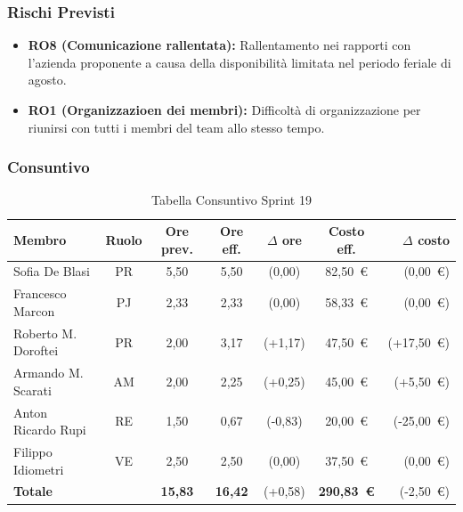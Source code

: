 \subsubsection{Rischi Previsti}
\begin{itemize}
    \item \textbf{RO8 (Comunicazione rallentata):} Rallentamento nei rapporti con l'azienda proponente a causa della disponibilità limitata nel periodo feriale di agosto.
    \item \textbf{RO1 (Organizzazioen dei membri):} Difficoltà di organizzazione per riunirsi con tutti i membri del team allo stesso tempo.
\end{itemize}

\subsubsection{Consuntivo}
\begin{table}[H]
    \centering
    \renewcommand{\arraystretch}{1.3}
    \begin{tabularx}{\textwidth}{|X|c|c|c|c|c|r|}
        \hline
        \textbf{Membro} & \textbf{Ruolo} & \textbf{Ore prev.} &
        \textbf{Ore eff.} & \textbf{$\Delta$ ore} &
        \textbf{Costo eff.} & \textbf{$\Delta$ costo} \\
        \hline
        Sofia De Blasi       & PR & 5,50 & 5,50 & {\color{green}(0,00)}  & 82{,}50~\euro & {\color{green}(0{,}00~\euro)} \\
        Francesco Marcon     & PJ & 2,33 & 2,33 & {\color{green}(0,00)} & 58{,}33~\euro  & {\color{green}(0{,}00~\euro)} \\
        Roberto M. Doroftei  & PR & 2,00 & 3,17 & {\color{red}(+1,17)}  & 47{,}50~\euro & {\color{red}(+17{,}50~\euro)} \\
        Armando M. Scarati   & AM & 2,00 & 2,25 & {\color{red}(+0,25)} & 45{,}00~\euro & {\color{red}(+5{,}50~\euro)} \\
        Anton Ricardo Rupi   & RE & 1,50 & 0,67 & {\color{green}(-0,83)} & 20{,}00~\euro & {\color{green}(-25{,}00~\euro)} \\
        Filippo Idiometri    & VE & 2,50 & 2,50 & {\color{green}(0,00)} & 37{,}50~\euro & {\color{green}(0{,}00~\euro)} \\
        \hline
        \textbf{Totale} & & \textbf{15,83} & \textbf{16,42} & {\color{red}(+0,58)} & \textbf{290{,}83~\euro} & {\color{green}(-2{,}50~\euro)} \\
        \hline
    \end{tabularx}
    \caption{Tabella Consuntivo Sprint 19}
\end{table}

